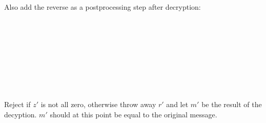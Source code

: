 Also add the reverse as a postprocessing step after decryption:

\makebox[1.5cm]{}\makebox[.5cm]{}\makebox[.4cm]{}\\
\makebox[1.5cm]{}\makebox[.5cm]{}\makebox[2.8cm]{$\downarrow$}\makebox[.4cm]{}\\
\makebox[1.5cm]{}\makebox[.5cm]{$\downarrow$}\makebox[2.8cm]{\rule[0.3cm]{2.8cm}{0.01cm}}\makebox[.4cm]{$\downarrow$}\\
\makebox[1.5cm]{}\makebox[.5cm]{$\downarrow$}\makebox[.4cm]{$\oplus$}\\
\makebox[6cm]{\makebox[3.5cm]{$\downarrow$}\makebox[.5cm]{}\makebox[2cm]{$\downarrow$}}\\
\makebox[1.5cm]{}\makebox[.5cm]{$\oplus$}\makebox[.4cm]{$\downarrow$}\\
\makebox[6cm]{\makebox[3.5cm]{$\downarrow$}\makebox[.5cm]{}\makebox[2cm]{$\downarrow$}}\\
\makebox[.5cm]{}\\

Reject if $z'$ is not all zero, otherwise throw away $r'$ and let $m'$ be the
result of the decyption. $m'$ should at this point be equal to the original
message.


